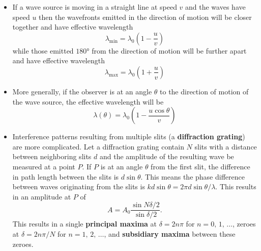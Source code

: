 \documentclass{article}
\begin{document}
\begin{itemize}
  \item If a wave source is moving in a straight line at speed $v$ and the waves have speed $u$ then the wavefronts emitted in the direction of motion will be closer together and have effective wavelength \[\lambda_\text{min} = \lambda_0 \left( 1 - \frac{u}{v} \right)\] while those emitted $\ang{180}$ from the direction of motion will be further apart and have effective wavelength \[\lambda_\text{max} = \lambda_0 \left( 1 + \frac{u}{v} \right)\]

  \item More generally, if the observer is at an angle $\theta$ to the direction of motion of the wave source, the effective wavelength will be \[\lambda(\theta) = \lambda_0 \left( 1 - \frac{u \cos \theta}{v} \right)\]

  \item Interference patterns resulting from multiple slits (a \textbf{diffraction grating}) are more complicated. Let a diffraction grating contain $N$ slits with a distance between neighboring slits $d$ and the amplitude of the resulting wave be measured at a point $P$. If $P$ is at an angle $\theta$ from the first slit, the difference in path length between the slits is $d \sin \theta$. This means the phase difference between waves originating from the slits is $k d \sin \theta = 2 \pi d \sin \theta / \lambda$. This results in an amplitude at $P$ of \[A = A_0 \frac{\sin N \delta / 2}{\sin \delta / 2}.\] This results in a single \textbf{principal maxima} at $\delta = 2n \pi$ for $n = 0, \,1, \,\ldots$, zeroes at $\delta = 2 n \pi / N$ for $n = 1, \,2, \,\ldots$, and \textbf{subsidiary maxima} between these zeroes.
\end{itemize}
\end{document}
